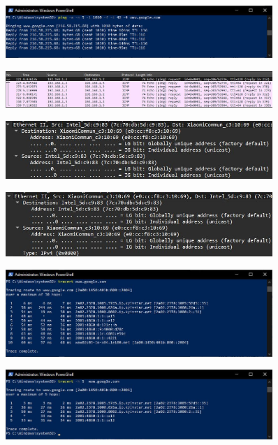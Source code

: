 \documentclass[12pt]{extarticle}
\begin{document}
\begin{figure}[H]
    \centering
    \includegraphics[width=0.90\textwidth]{ping_params.jpg}
    \caption{}
\end{figure}
\begin{figure}[H]
    \centering
    \includegraphics[width=0.90\textwidth]{icmp.jpg}
    \caption{}
\end{figure}
\begin{figure}[H]
    \centering
    \includegraphics[width=0.90\textwidth]{icnp_phone.jpg}
    \caption{}
\end{figure}
\begin{figure}[H]
    \centering
    \includegraphics[width=0.90\textwidth]{icmp_laptop.jpg}
    \caption{}
\end{figure}
\begin{figure}[H]
    \centering
    \includegraphics[width=0.90\textwidth]{tracert.jpg}
    \caption{}
\end{figure}
\begin{figure}[H]
    \centering
    \includegraphics[width=0.90\textwidth]{tracert-d.jpg}
    \caption{}
\end{figure}
\end{document}
